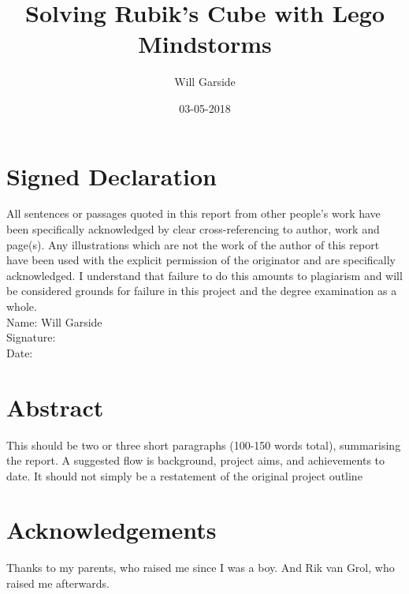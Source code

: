 \documentclass{report}
\title{Solving Rubik's Cube with Lego Mindstorms}
\date{03-05-2018}
\author{Will Garside}
\begin{document}
	\maketitle
	\newpage

	\renewcommand{\thechapter}{\Roman{chapter}}
	\chapter{Signed Declaration}
	All sentences or passages quoted in this report from other people's work have been specifically acknowledged by clear cross-referencing to author, work and page(s). Any illustrations which are not the work of the author of this report have been used with the explicit permission of the originator and are specifically acknowledged. I understand that failure to do this amounts to plagiarism and will be considered grounds for failure in this project and the degree examination as a whole.
	\\Name: Will Garside
	\\Signature:
	\\Date: 

	\newpage
	\chapter{Abstract}
	This should be two or three short paragraphs (100-150 words total), summarising the report. A suggested flow is background, project aims, and achievements to date. It should not simply be a restatement of the original project outline
	
	\newpage
	\chapter{Acknowledgements}
	Thanks to my parents, who raised me since I was a boy. And Rik van Grol, who raised me afterwards.
	
	\newpage
\end{document}

